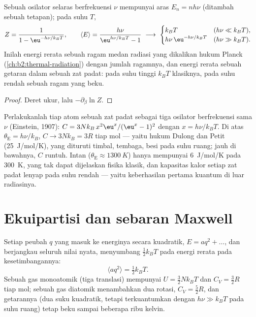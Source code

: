 \begin{proposition}\label{prop:b2:boltzmann-factor:oscillator}
Sebuah osilator selaras berfrekuensi $\nu$ mempunyai aras $E_n = nh\nu$ (ditambah
sebuah tetapan); pada suhu $T$,
\[
Z = \frac{1}{1 - \eu^{-h\nu/k_BT}}, \qquad
\langle E\rangle = \frac{h\nu}{\eu^{h\nu/k_BT} - 1}
\ \longrightarrow\
\begin{cases} k_BT & (h\nu \ll k_BT), \\ h\nu\,\eu^{-h\nu/k_BT} & (h\nu \gg k_BT). \end{cases}
\]
Inilah energi rerata sebuah ragam medan radiasi yang dikalikan hukum
Planck (\cref{ch:b2:thermal-radiation}) dengan jumlah ragamnya,
dan energi rerata sebuah getaran dalam sebuah zat padat: pada suhu tinggi
$k_BT$ klasiknya, pada suhu rendah sebuah ragam yang beku.
\end{proposition}

\begin{proof}
Deret ukur, lalu $-\partial_\beta\ln Z$.
\end{proof}

\begin{example}\label{ex:b2:boltzmann-factor:einstein}
Perlakukanlah tiap atom sebuah zat padat sebagai tiga osilator berfrekuensi sama
$\nu$ (Einstein, 1907): $C = 3Nk_B\,x^2\eu^x/(\eu^x - 1)^2$ dengan $x =
h\nu/k_BT$. Di atas $\theta_{\text{E}} = h\nu/k_B$, $C \to 3Nk_B = 3R$ tiap mol
--- yaitu hukum Dulong dan Petit (\qty{25}{J/mol/K}), yang dituruti timbal,
tembaga, besi pada suhu ruang; jauh di bawahnya, $C$ runtuh. Intan
($\theta_{\text{E}} \approx \qty{1300}{K}$) hanya mempunyai \qty{6}{J/mol/K} pada
\qty{300}{K}, yang tak dapat dijelaskan fisika klasik, dan kapasitas kalor setiap
zat padat lenyap pada suhu rendah --- yaitu keberhasilan pertama
kuantum di luar radiasinya.
\end{example}

\section{Ekuipartisi dan sebaran Maxwell}

\begin{theorem}\label{thm:b2:boltzmann-factor:equipartition}
Setiap peubah $q$ yang masuk ke energinya secara kuadratik, $E = aq^2 +
\dots$, dan berjangkau seluruh nilai nyata, menyumbang $\tfrac12k_BT$ pada
energi rerata pada kesetimbangannya:
\[
\langle aq^2\rangle = \tfrac12k_BT .
\]
Sebuah gas monoatomik (tiga translasi) mempunyai $U = \tfrac32Nk_BT$ dan $C_V =
\tfrac32R$ tiap mol; sebuah gas diatomik menambahkan dua rotasi, $C_V = \tfrac52R$,
dan getarannya (dua suku kuadratik, tetapi terkuantumkan dengan $h\nu \gg
k_BT$ pada suhu ruang) tetap beku sampai beberapa ribu kelvin.
\end{theorem}

